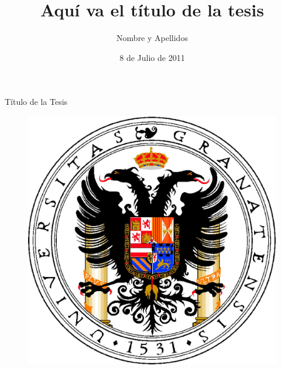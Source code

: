 \documentclass[b5paper,twoside,10pt]{book}
\date{8 de Julio de 2011}
\title{Aquí va el título de la tesis}
\author{Nombre y Apellidos}
\begin{document}


\frontmatter

\renewcommand{\labelitemi}{$\bullet$}
\renewcommand{\labelitemii}{---}
\renewcommand{\labelitemiii}{--}


\pagestyle{empty}
\begin{center}
\LARGE
Título de la Tesis
\end{center}
\vspace{20ex}
\begin{figure}[h]
\centering
\includegraphics[width=.5\textwidth]{escudo_ugr_portada.eps}
\end{figure}
\vspace{25ex}
\end{document}
